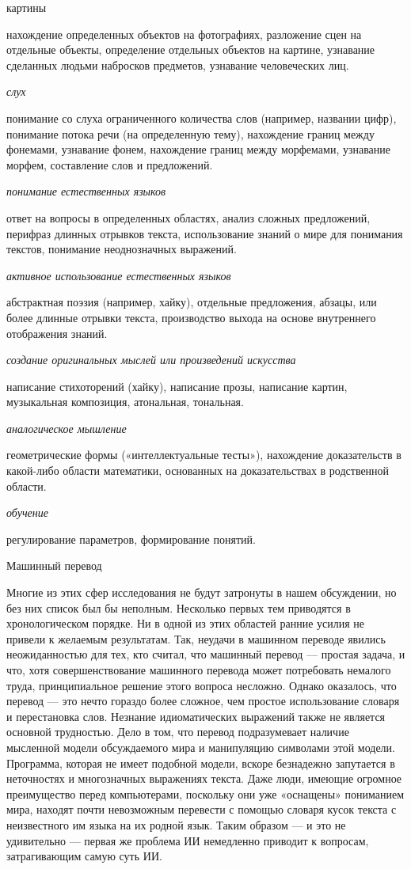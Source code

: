 \documentclass[../main.tex]{subfiles}
\begin{document}
картины

нахождение определенных объектов на фотографиях, разложение сцен на отдельные объекты, определение отдельных объектов на картине, узнавание сделанных людьми набросков предметов, узнавание человеческих лиц.

\emph{слух}

понимание со слуха ограниченного количества слов (например, названии цифр), понимание потока речи (на определенную тему), нахождение границ между фонемами, узнавание фонем, нахождение границ между морфемами, узнавание морфем, составление слов и предложений.

\emph{понимание естественных языков}

ответ на вопросы в определенных областях, анализ сложных предложений, перифраз длинных отрывков текста, использование знаний о мире для понимания текстов, понимание неоднозначных выражений.

\emph{активное использование естественных языков}

абстрактная поэзия (например, хайку), отдельные предложения, абзацы, или более длинные отрывки текста, производство выхода на основе внутреннего отображения знаний.

\emph{создание оригинальных мыслей или произведений искусства}

написание стихоторений (хайку), написание прозы, написание картин, музыкальная композиция, атональная, тональная.

\emph{аналогическое мышление}

геометрические формы («интеллектуальные тесты»), нахождение доказательств в какой-либо области математики, основанных на доказательствах в родственной области.

\emph{обучение}

регулирование параметров, формирование понятий.

Машинный перевод

Многие из этих сфер исследования не будут затронуты в нашем обсуждении, но без них список был бы неполным. Несколько первых тем приводятся в хронологическом порядке. Ни в одной из этих областей ранние усилия не привели к желаемым результатам. Так, неудачи в машинном переводе явились неожиданностью для тех, кто считал, что машинный перевод --- простая задача, и что, хотя совершенствование машинного перевода может потребовать немалого труда, принципиальное решение этого вопроса несложно. Однако оказалось, что перевод --- это нечто гораздо более сложное, чем простое использование словаря и перестановка слов. Незнание идиоматических выражений также не является основной трудностью. Дело в том, что перевод подразумевает наличие мысленной модели обсуждаемого мира и манипуляцию символами этой модели. Программа, которая не имеет подобной модели, вскоре безнадежно запутается в неточностях и многозначных выражениях текста. Даже люди, имеющие огромное преимущество перед компьютерами, поскольку они уже «оснащены» пониманием мира, находят почти невозможным перевести с помощью словаря кусок текста с неизвестного им языка на их родной язык. Таким образом --- и это не удивительно --- первая же проблема ИИ немедленно приводит к вопросам, затрагивающим самую суть ИИ.
\end{document}
